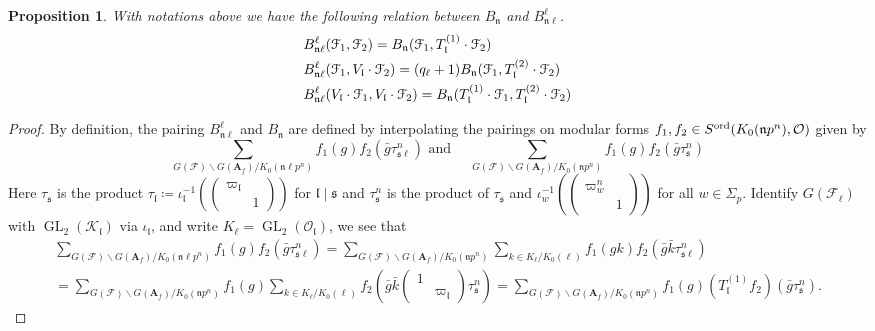 \documentclass[leqno]{amsart}
\newtheorem{prop}[thm]{Proposition}
\theoremstyle{definition}
\theoremstyle{remark}
\newcommand{\smat}[1]{\left(\begin{smallmatrix} #1 \end{smallmatrix}\right)}
\newcommand{\oo}{\mathcal{O}}
\newcommand{\A}{\mathbf A}
\DeclareMathOperator{\GL}{GL}
\newcommand{\fl}{\mathfrak{l}}
\newcommand{\fn}{\mathfrak{n}}
\newcommand{\fs}{\mathfrak{s}}
\newcommand{\F}{{\mathcal{F}}} %
\newcommand{\K}{{\mathcal{K}}} %
\newcommand{\euF}{\EuScript{F}} %
\newcommand{\ord}{\textnormal{ord}} %
\begin{document}
\begin{prop}\label{prop:pair_at_deff_level}
	With notations above we have the following
	relation between $B_{\fn}$
	and $B_{\fn\ell}^\ell$.
	\begin{align*}
	&B_{\fn\ell}^{\ell}(\euF_1,\euF_2)=
	B_{\fn}(\euF_1,T_{\fl}^{(1)}\cdot \euF_2)\\
	&B_{\fn\ell}^{\ell}(\euF_1,V_{\fl}\cdot\euF_2)=
	(q_\ell+1) B_{\fn}(\euF_1,
	T_{\fl}^{(2)}\cdot\euF_2)\\
	&B_{\fn\ell}^\ell
	(V_{\fl}\cdot \euF_1,V_{\fl}\cdot\euF_2)=
	B_{\fn} (T_{\fl}^{(1)}\cdot\euF_1,
	T_{\fl}^{(2)}\cdot \euF_2)
	\end{align*}
\end{prop}
\begin{proof}
	By definition,
	the pairing $B_{\fn\ell}^\ell$
	and $B_{\fn}$ are defined by 
	interpolating the pairings 
	on modular forms
	$f_1,f_2\in S^{\ord}(K_0(\fn p^n),\oo)$
	given by 
	\[
	\sum_{G(\F)\backslash G(\A_f)/K_0(\fn\ell p^n)}
	f_1(g)f_2(\bar{g}\tau_{\fs\ell}^n)\text{ and }\quad
	\sum_{G(\F)\backslash G(\A_f)/K_0(\fn p^n)}
	f_1(g)f_2(\bar{g}\tau_{\fs}^n)
	\]
	Here $\tau_{\fs}$ is the product 
	$\tau_\fl\coloneqq
	\iota_{\fl}^{-1}(\smat{\varpi_\fl&\\&1})$
	for $\fl\mid \fs$
	and  $\tau_{\fs}^n$ is the product
	of $\tau_{\fs}$ and 
	$\iota_{w}^{-1}(\smat{\varpi_w^n&\\&1})$
	for all $w\in \Sigma_p$.
	Identify $G(\F_\ell)$ with  $\GL_2(\K_\fl)$
	via  $\iota_\fl$, and 
	write $K_\ell=\GL_2(\oo_\fl)$, we see that 
	\begin{multline*}
	\sum_{G(\F)\backslash G(\A_f)/K_0(\fn\ell p^n)}
	f_1(g)f_2(\bar{g}\tau_{\fs\ell}^n)=
	\sum_{G(\F)\backslash G(\A_f)/K_0(\fn p^n)}
	\sum_{k\in K_\ell/K_0(\ell)}
	f_1(gk)f_2(\bar{g}\bar{k}\tau_{\fs\ell}^n)\\=
	\sum_{G(\F)\backslash G(\A_f)/K_0(\fn p^n)} f_1(g)
	\sum_{k\in K_\ell/K_0(\ell)}
	f_2(\bar{g}\bar{k}\smat{1&\\&\varpi_\fl}
	\tau_{\fs}^n)=
	\sum_{G(\F)\backslash G(\A_f)/K_0(\fn p^n)} f_1(g)
	(T_\fl^{(1)}f_2)(\bar{g}\tau_{\fs}^n).
	\end{multline*}

\end{proof}
\end{document}
